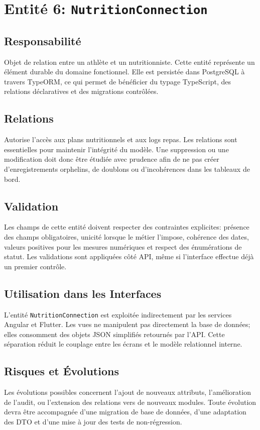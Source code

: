 \section{Entité 6: \texttt{NutritionConnection}}
\subsection{Responsabilité}
Objet de relation entre un athlète et un nutritionniste. Cette entité représente un élément durable du domaine fonctionnel. Elle est persistée dans PostgreSQL à travers TypeORM, ce qui permet de bénéficier du typage TypeScript, des relations déclaratives et des migrations contrôlées.

\subsection{Relations}
Autorise l’accès aux plans nutritionnels et aux logs repas. Les relations sont essentielles pour maintenir l'intégrité du modèle. Une suppression ou une modification doit donc être étudiée avec prudence afin de ne pas créer d'enregistrements orphelins, de doublons ou d'incohérences dans les tableaux de bord.

\subsection{Validation}
Les champs de cette entité doivent respecter des contraintes explicites: présence des champs obligatoires, unicité lorsque le métier l'impose, cohérence des dates, valeurs positives pour les mesures numériques et respect des énumérations de statut. Les validations sont appliquées côté API, même si l'interface effectue déjà un premier contrôle.

\subsection{Utilisation dans les Interfaces}
L'entité \texttt{NutritionConnection} est exploitée indirectement par les services Angular et Flutter. Les vues ne manipulent pas directement la base de données; elles consomment des objets JSON simplifiés retournés par l'API. Cette séparation réduit le couplage entre les écrans et le modèle relationnel interne.

\subsection{Risques et Évolutions}
Les évolutions possibles concernent l'ajout de nouveaux attributs, l'amélioration de l'audit, ou l'extension des relations vers de nouveaux modules. Toute évolution devra être accompagnée d'une migration de base de données, d'une adaptation des DTO et d'une mise à jour des tests de non-régression.

